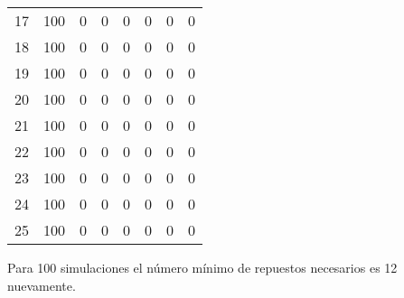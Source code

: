 \begin{table}[h]
{\begin{tabular}{|c|c|c|c|c|c|c|c|}
17 & 100 & 0 & 0 & 0 & 0 & 0 & 0 \\
18 & 100 & 0 & 0 & 0 & 0 & 0 & 0 \\
19 & 100 & 0 & 0 & 0 & 0 & 0 & 0 \\
20 & 100 & 0 & 0 & 0 & 0 & 0 & 0 \\
21 & 100 & 0 & 0 & 0 & 0 & 0 & 0 \\
22 & 100 & 0 & 0 & 0 & 0 & 0 & 0 \\
23 & 100 & 0 & 0 & 0 & 0 & 0 & 0 \\
24 & 100 & 0 & 0 & 0 & 0 & 0 & 0 \\
25 & 100 & 0 & 0 & 0 & 0 & 0 & 0 \\ \hline
\end{tabular}%
}
\end{table}

Para 100 simulaciones el número mínimo de repuestos necesarios es 12 nuevamente.

\newpage

